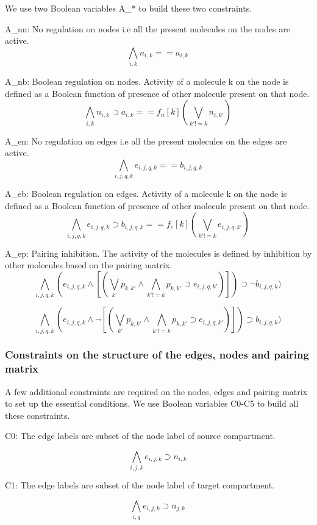 We use two Boolean variables A\_* to build these two constraints. \newline

A\_nn: No regulation on nodes i.e all the present molecules on the nodes are active.
\[ \bigwedge\limits_{i,k} n_{i,k} == a_{i,k} \, \]  

A\_nb: Boolean regulation on nodes. Activity of a molecule k on the node is defined as a Boolean function of presence of other molecule present on that node.
\[ \bigwedge\limits_{i,k} n_{i,k} \supset a_{i,k} ==   f_n[k] (\bigvee_{ k' != k} n_{i,k'}) \, \]

A\_en: No regulation on edges i.e all the present molecules on the edges are active.
\[ \bigwedge\limits_{i,j,q,k} e_{i,j,q,k} == b_{i,j,q,k} \, \]    

A\_eb: Boolean regulation on edges. Activity of a molecule k on the node is defined as a Boolean function of presence of other molecule present on that node.
\[ \bigwedge\limits_{i,j,q,k} e_{i,j,q,k} \supset b_{i,j,q,k} == f_e[k](\bigvee_{k' != k} e_{i,j,q,k'}) \, \]  

A\_ep: Pairing inhibition. The activity of the molecules is defined by inhibition by other molecules based on the pairing matrix. 
\[ \bigwedge\limits_{i,j,q, k}  (e_{i,j,q,k} \land [ ( \bigvee_{k'} p_{k,k'} \land \bigwedge_{k' != k} p_{k,k'} \supset e_{i,j,q,k'})] ) \supset \neg b_{i,j,q,k}) \, \]  

\[ \bigwedge\limits_{i,j, q, k}  (e_{i,j,q,k} \land \neg [ ( \bigvee_{k'} p_{k,k'} \land \bigwedge_{k' != k} p_{k,k'} \supset e_{i,j,q,k'})] ) \supset b_{i,j,q,k}) \, \]  

\subsubsection{Constraints on the structure of the edges, nodes and pairing matrix}
A few additional constraints are required on the nodes, edges and pairing matrix to set up the essential conditions. We use Boolean variables C0-C5 to build all these constraints.

C0: The edge labels are subset of the node label of source compartment.

\[ \bigwedge\limits_{i,j,k} e_{i,j,k} \supset n_{i,k} \, \]  

C1: The edge labels are subset of the node label of target compartment.

\[ \bigwedge\limits_{i,q}  e_{i,j,k} \supset n_{j,k} \, \]  

